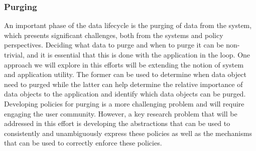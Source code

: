 \subsubsection*{Purging}
\label{sec:purging-data}
An important phase of the data lifecycle is the purging of data from the system, 
which presents significant challenges, both from the systems and policy perspectives. 
Deciding what data to purge and when to purge it can be non-trivial, and it is 
essential that this is done with the application in the loop. One approach we will 
explore in this efforts will be extending the notion of system and application utility. 
The former can be used to determine when data object need to purged while the 
latter can help determine the relative importance of data objects to the 
application and identify which data objects can be purged. Developing policies 
for purging is a more challenging problem and will require engaging  the 
user community. However, a key research problem that will be addressed in
 this effort is developing the abstractions that can be used to consistently and 
 unambiguously express these policies as well as the mechanisms that can be 
 used to correctly enforce these policies. 








